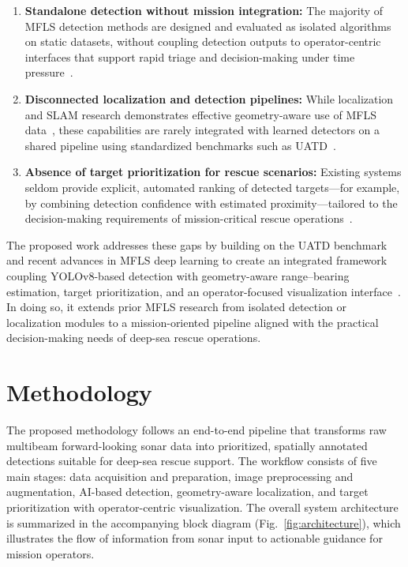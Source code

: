 \documentclass[conference]{IEEEtran}
\begin{document}
\begin{enumerate}
    \item \textbf{Standalone detection without mission integration:} The majority of MFLS detection methods are designed and evaluated as isolated algorithms on static datasets, without coupling detection outputs to operator-centric interfaces that support rapid triage and decision-making under time pressure~\cite{ref7, ref12, ref14}.
    \item \textbf{Disconnected localization and detection pipelines:} While localization and SLAM research demonstrates effective geometry-aware use of MFLS data~\cite{ref3, ref5}, these capabilities are rarely integrated with learned detectors on a shared pipeline using standardized benchmarks such as UATD~\cite{ref10}.
    \item \textbf{Absence of target prioritization for rescue scenarios:} Existing systems seldom provide explicit, automated ranking of detected targets---for example, by combining detection confidence with estimated proximity---tailored to the decision-making requirements of mission-critical rescue operations~\cite{ref4, ref20}.
\end{enumerate}

The proposed work addresses these gaps by building on the UATD benchmark and recent advances in MFLS deep learning to create an integrated framework coupling YOLOv8-based detection with geometry-aware range--bearing estimation, target prioritization, and an operator-focused visualization interface~\cite{ref10, ref12}. In doing so, it extends prior MFLS research from isolated detection or localization modules to a mission-oriented pipeline aligned with the practical decision-making needs of deep-sea rescue operations.

\section{Methodology}

The proposed methodology follows an end-to-end pipeline that transforms raw multibeam forward-looking sonar data into prioritized, spatially annotated detections suitable for deep-sea rescue support. The workflow consists of five main stages: data acquisition and preparation, image preprocessing and augmentation, AI-based detection, geometry-aware localization, and target prioritization with operator-centric visualization. The overall system architecture is summarized in the accompanying block diagram (Fig.~\ref{fig:architecture}), which illustrates the flow of information from sonar input to actionable guidance for mission operators.
\end{document}
